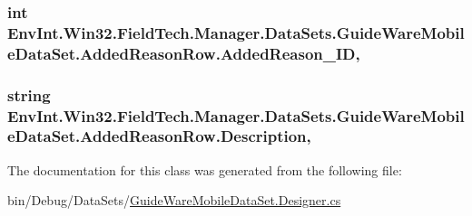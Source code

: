 \subsubsection[{Added\+Reason\+\_\+\+I\+D}]{\setlength{\rightskip}{0pt plus 5cm}int Env\+Int.\+Win32.\+Field\+Tech.\+Manager.\+Data\+Sets.\+Guide\+Ware\+Mobile\+Data\+Set.\+Added\+Reason\+Row.\+Added\+Reason\+\_\+\+I\+D\hspace{0.3cm}{\ttfamily [get]}, {\ttfamily [set]}}\label{class_env_int_1_1_win32_1_1_field_tech_1_1_manager_1_1_data_sets_1_1_guide_ware_mobile_data_set_1_1_added_reason_row_a0670fef7b16bd62c4317cc8e0d065049}
\hypertarget{class_env_int_1_1_win32_1_1_field_tech_1_1_manager_1_1_data_sets_1_1_guide_ware_mobile_data_set_1_1_added_reason_row_a2d850dea5ea34e51ae246da92ec5e384}{}
\subsubsection[{Description}]{\setlength{\rightskip}{0pt plus 5cm}string Env\+Int.\+Win32.\+Field\+Tech.\+Manager.\+Data\+Sets.\+Guide\+Ware\+Mobile\+Data\+Set.\+Added\+Reason\+Row.\+Description\hspace{0.3cm}{\ttfamily [get]}, {\ttfamily [set]}}\label{class_env_int_1_1_win32_1_1_field_tech_1_1_manager_1_1_data_sets_1_1_guide_ware_mobile_data_set_1_1_added_reason_row_a2d850dea5ea34e51ae246da92ec5e384}


The documentation for this class was generated from the following file\+:\begin{DoxyCompactItemize}
\item 
bin/\+Debug/\+Data\+Sets/\hyperlink{bin_2_debug_2_data_sets_2_guide_ware_mobile_data_set_8_designer_8cs}{Guide\+Ware\+Mobile\+Data\+Set.\+Designer.\+cs}\end{DoxyCompactItemize}
